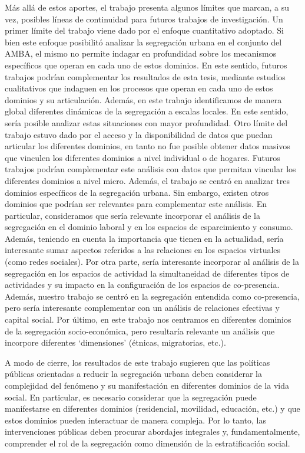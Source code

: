 \documentclass[
  spanish,
  a4paper,%
  chapterprefix=true,%
  DIV=calc,%
  twoside]{scrbook}%
\begin{document}
Más allá de estos aportes, el trabajo presenta algunos límites
que marcan, a su vez, posibles líneas de continuidad para futuros
trabajos de investigación.
Un primer límite del
trabajo viene dado por el enfoque cuantitativo adoptado. Si bien este
enfoque posibilitó analizar la segregación urbana en el conjunto del AMBA,
el mismo no permite indagar en profundidad sobre los mecanismos
específicos que operan en cada uno de estos dominios. En este sentido,
futuros trabajos podrían complementar los resultados de esta tesis,
mediante estudios cualitativos que indaguen en los procesos que operan
en cada uno de estos dominios y su articulación. Además, en
este trabajo identificamos de manera global diferentes dinámicas de la
segregación a escalas locales. En este sentido, sería posible analizar
estas situaciones con mayor profundidad.
Otro límite del trabajo estuvo dado por el acceso y la disponibilidad de
datos que puedan articular los diferentes dominios, en tanto no
fue posible obtener datos masivos que vinculen los diferentes dominios a
nivel individual o de hogares. Futuros trabajos podrían
complementar este análisis con datos que permitan vincular los
diferentes dominios a nivel micro. Además, el
trabajo se centró en analizar tres dominios específicos de la
segregación urbana. Sin embargo, existen otros dominios que podrían ser
relevantes para complementar este análisis. En particular, consideramos
que sería relevante incorporar el análisis de la segregación en el
dominio laboral y en los espacios de esparcimiento y consumo. Además,
teniendo en cuenta la importancia que tienen en la actualidad, sería
interesante sumar aspectos referidos a las relaciones en los espacios
virtuales (como redes sociales).
Por otra parte, sería
interesante incorporar al análisis de la segregación en los espacios de
actividad la simultaneidad de diferentes tipos de actividades y su
impacto en la configuración de los espacios de co-presencia. Además,
nuestro trabajo se centró en la segregación entendida como co-presencia,
pero sería interesante complementar con un análisis de relaciones
efectivas y capital social. Por
último, en este trabajo nos centramos en diferentes dominios de la
segregación socio-económica, pero resultaría relevante un análisis que
incorpore diferentes `dimensiones' (étnicas, migratorias, etc.).

A modo de cierre, los resultados de este trabajo sugieren que las
políticas públicas orientadas a reducir la segregación urbana deben
considerar la complejidad del fenómeno y su manifestación en diferentes
dominios de la vida social. En particular, es necesario considerar que
la segregación puede manifestarse en diferentes dominios (residencial,
movilidad, educación, etc.) y que estos dominios pueden interactuar de
manera compleja. Por lo tanto, las intervenciones públicas deben
procurar abordajes integrales y, fundamentalmente, comprender el rol de
la segregación como dimensión de la estratificación social.
\end{document}
